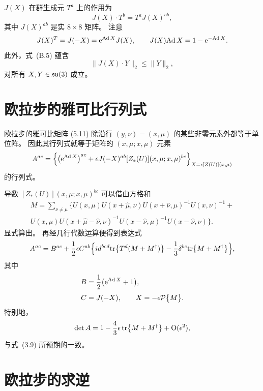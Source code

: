 $J(X)$ 在群生成元 $T^a$ 上的作用为
\begin{equation}
  J(X)\cdot T^b=T^aJ(X)^{ab},
\end{equation}
其中 $J(X)^{ab}$ 是实 $8\times8$ 矩阵。
注意
\begin{equation}
  J(X)^T=J(-X)=\mathrm{e}^{\mathrm{Ad}\, X}J(X),
  \qquad
  J(X)\mathrm{Ad}\, X=1-\mathrm{e}^{-\mathrm{Ad}\, X}.
\end{equation}
此外，式~(B.5) 蕴含
\begin{equation}
  \|J(X)\cdot Y\|_2\leq\|Y\|_2,
\end{equation}
对所有 $X,Y\in\mathfrak{su}(3)$ 成立。

\section{欧拉步的雅可比行列式}

欧拉步的雅可比矩阵 (5.11)
除沿行 $(y,\nu)=(x,\mu)$ 的某些非零元素外都等于单位阵。
因此其行列式就等于矩阵的 $(x,\mu;x,\mu)$ 元素
\begin{equation}
  A^{ac}=\left\{\left(\mathrm{e}^{\mathrm{Ad}\, X}\right)^{ac}
  +\epsilon J(-X)^{ab}[Z_{*}(U)](x,\mu;x,\mu)^{bc}
  \right\}_{X=\epsilon[Z(U)](x,\mu)}
\end{equation}
的行列式。

导数 $[Z_{*}(U)](x,\mu;x,\mu)^{bc}$
可以借由方格和
\begin{multline}
  M=\sum_{\nu\neq\mu}\bigl\{
  U(x,\mu)U(x+\hat{\mu},\nu)U(x+\hat{\nu},\mu)^{-1}U(x,\nu)^{-1}+\\
  U(x,\mu)U(x+\hat{\mu}-\hat{\nu},\nu)^{-1}U(x-\hat{\nu},\mu)^{-1}
  U(x-\hat{\nu},\nu)\bigr\}.
\end{multline}
显式算出。
再经几行代数运算便得到表达式
\begin{equation}
  A^{ac}=B^{ac}+\frac{1}{2}\epsilon C^{ab}\Bigl\{
  id^{bcd}\mathrm{tr}\bigl\{T^d(M+M^{\dagger})\bigr\}
  -\frac{1}{3}\delta^{bc}\mathrm{tr}\bigl\{M+M^{\dagger}\bigr\}\Bigl\},
\end{equation}
其中
\begin{align}
  B&=\frac{1}{2}\bigl(\mathrm{e}^{\mathrm{Ad}\, X}+1\bigr),
  \\[0.6ex]
  C&=J(-X),\qquad X=-\epsilon\mathcal{P}\bigl\{M\bigr\}.
\end{align}
特别地，
\begin{equation}
  \det A=1-\frac{4}{3}\epsilon\,\mathrm{tr}\bigl\{M+M^{\dagger}\bigr\}+\mathrm{O}(\epsilon^2),
\end{equation}
与式~(3.9) 所预期的一致。

\section{欧拉步的求逆}

